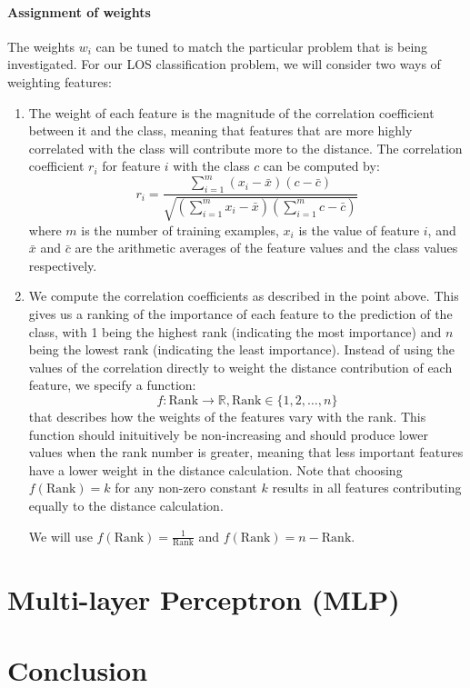 \paragraph{Assignment of weights}
The weights $w_i$ can be tuned to match the particular problem that is being
investigated. For our LOS classification problem, we will consider two ways
of weighting features:
\begin{enumerate}
\item The weight of each feature is the magnitude of the correlation
coefficient
between it and the class, meaning that features that are more highly correlated
with the class will contribute more to the distance. The correlation
coefficient $r_i$ for feature $i$ with the class $c$ can be computed by:
\begin{equation*}
r_i = \dfrac{\sum_{i=1}^m (x_i-\bar{x})(c-\bar{c})}{\sqrt{(\sum_{i=1}^m x_i-\bar{x})(\sum_{i=1}^m c-\bar{c})}}
\end{equation*}
where $m$ is the number of training examples, $x_i$ is the value of feature
$i$, and $\bar{x}$ and $\bar{c}$ are the arithmetic averages of the feature
values and the class values respectively. 
\item We compute the correlation coefficients as described in the point above.
This gives us a ranking of the importance of each feature to the prediction of
the class, with 1 being the highest rank (indicating the most importance) and
$n$ being the lowest rank (indicating the least importance).
Instead of using the values of the correlation directly to weight
the distance contribution of each feature, we specify a function:
\begin{equation*}
f : \mathrm{Rank} \rightarrow \mathbb{R}, \mathrm{Rank} \in \{1,2,\ldots,n\}
\end{equation*}
that describes
how the weights of the features vary with the rank. This function should
inituitively be non-increasing and should produce lower values when the rank
number is greater, meaning that less important features have a lower weight
in the distance calculation.
Note that choosing $f(\mathrm{Rank}) = k$ for any non-zero constant $k$
results in all features contributing equally to the distance calculation.

\noindent We will use $f(\mathrm{Rank}) = \frac{1}{\mathrm{Rank}}$ and
$f(\mathrm{Rank}) = n-\mathrm{Rank}$.
\end{enumerate}

\section{Multi-layer Perceptron (MLP)}

\section{Conclusion}
